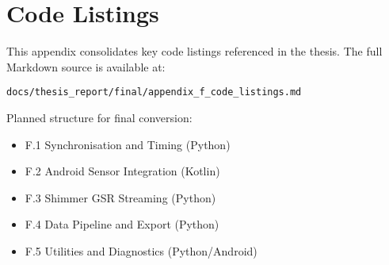 \chapter{Code Listings}


This appendix consolidates key code listings referenced in the thesis. The full Markdown source is available at:
\begin{verbatim}
docs/thesis_report/final/appendix_f_code_listings.md
\end{verbatim}

Planned structure for final conversion:
\begin{itemize}
  \item F.1 Synchronisation and Timing (Python)
  \item F.2 Android Sensor Integration (Kotlin)
  \item F.3 Shimmer GSR Streaming (Python)
  \item F.4 Data Pipeline and Export (Python)
  \item F.5 Utilities and Diagnostics (Python/Android)
\end{itemize}
